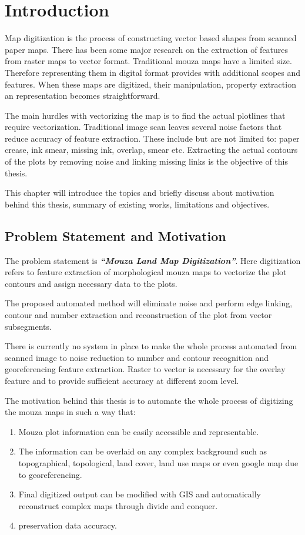 \chapter{Introduction}\label{intro}

Map digitization is the process of constructing vector based shapes from scanned paper maps. There has been some major research on the extraction of features from raster maps to vector format. Traditional mouza maps have a limited size. Therefore representing them in digital format provides with additional scopes and features. When these maps are digitized, their manipulation, property extraction an representation becomes straightforward. 

The main hurdles with vectorizing the map is to find the actual plotlines that require vectorization. Traditional image scan leaves several noise factors that reduce accuracy of feature extraction. These include but are not limited to: paper crease, ink smear, missing ink, overlap, smear etc. Extracting the actual contours of the plots by removing noise and linking missing links is the objective of this thesis.

This chapter will introduce the topics and briefly discuss about motivation behind this thesis, summary of existing works, limitations and objectives.

\section{Problem Statement and Motivation}

The problem statement is \textbf{\textit{``Mouza Land Map Digitization''}}. Here digitization refers to feature extraction of morphological mouza maps to vectorize the plot contours and assign necessary data to the plots.

The proposed automated method will eliminate noise and perform edge linking, contour and number extraction and reconstruction of the plot from vector subsegments.

There is currently no system in place to make the whole process automated from scanned image to noise reduction to number and contour recognition and georeferencing feature extraction. Raster to vector is necessary for the overlay feature and to provide sufficient accuracy at different zoom level.

The motivation behind this thesis is to automate the whole process of digitizing the mouza maps in such a way that:
\begin{enumerate}
\item Mouza plot information can be easily accessible and representable.
\item The information can be overlaid on any complex background such as topographical, topological, land cover, land use maps or even google map due to georeferencing.
\item Final digitized output can be modified with GIS and automatically reconstruct complex maps through divide and conquer.
\item preservation data accuracy.
\end{enumerate}

